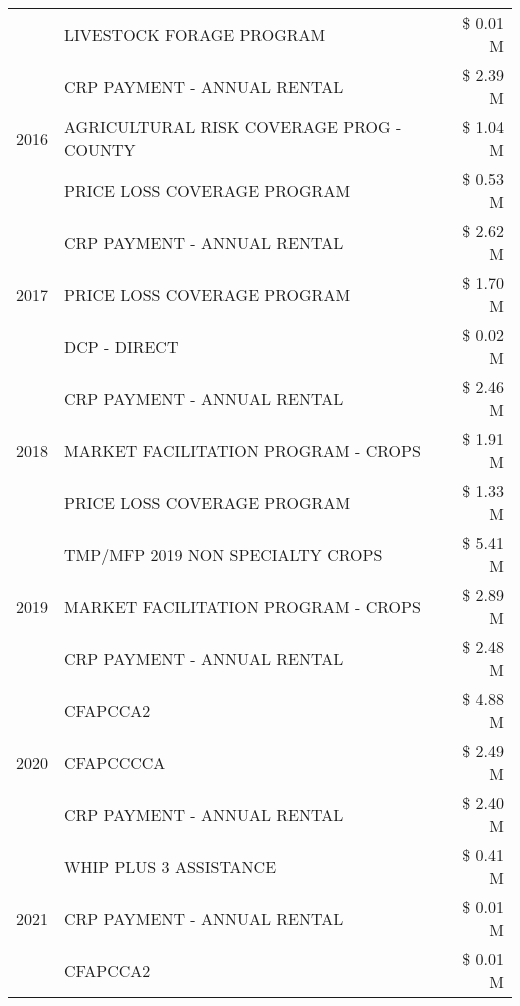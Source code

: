 \begin{tabular}{llr}
 & LIVESTOCK FORAGE PROGRAM & \$ 0.01 M \\
\cline{1-3}
\multirow[t]{3}{*}{2016} & CRP PAYMENT - ANNUAL RENTAL & \$ 2.39 M \\
 & AGRICULTURAL RISK COVERAGE PROG - COUNTY & \$ 1.04 M \\
 & PRICE LOSS COVERAGE PROGRAM & \$ 0.53 M \\
\cline{1-3}
\multirow[t]{3}{*}{2017} & CRP PAYMENT - ANNUAL RENTAL & \$ 2.62 M \\
 & PRICE LOSS COVERAGE PROGRAM & \$ 1.70 M \\
 & DCP - DIRECT & \$ 0.02 M \\
\cline{1-3}
\multirow[t]{3}{*}{2018} & CRP PAYMENT - ANNUAL RENTAL & \$ 2.46 M \\
 & MARKET FACILITATION PROGRAM - CROPS & \$ 1.91 M \\
 & PRICE LOSS COVERAGE PROGRAM & \$ 1.33 M \\
\cline{1-3}
\multirow[t]{3}{*}{2019} & TMP/MFP 2019 NON SPECIALTY CROPS & \$ 5.41 M \\
 & MARKET FACILITATION PROGRAM - CROPS & \$ 2.89 M \\
 & CRP PAYMENT - ANNUAL RENTAL & \$ 2.48 M \\
\cline{1-3}
\multirow[t]{3}{*}{2020} & CFAPCCA2 & \$ 4.88 M \\
 & CFAPCCCCA & \$ 2.49 M \\
 & CRP PAYMENT - ANNUAL RENTAL & \$ 2.40 M \\
\cline{1-3}
\multirow[t]{3}{*}{2021} & WHIP PLUS 3 ASSISTANCE & \$ 0.41 M \\
 & CRP PAYMENT - ANNUAL RENTAL & \$ 0.01 M \\
 & CFAPCCA2 & \$ 0.01 M \\
\cline{1-3}
\bottomrule
\end{tabular}
